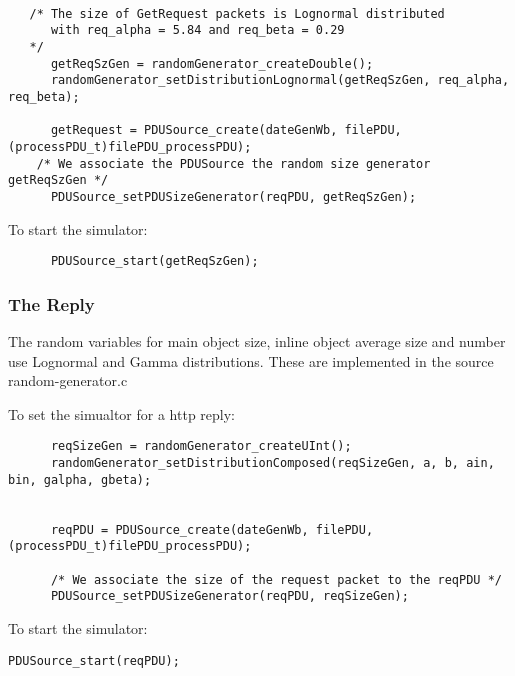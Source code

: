 \begin{verbatim}

   /* The size of GetRequest packets is Lognormal distributed 
      with req_alpha = 5.84 and req_beta = 0.29
   */    
      getReqSzGen = randomGenerator_createDouble();
      randomGenerator_setDistributionLognormal(getReqSzGen, req_alpha, req_beta);
      
      getRequest = PDUSource_create(dateGenWb, filePDU, (processPDU_t)filePDU_processPDU); 
    /* We associate the PDUSource the random size generator getReqSzGen */
      PDUSource_setPDUSizeGenerator(reqPDU, getReqSzGen);

\end{verbatim}

 To start the simulator:
\begin{verbatim}
      PDUSource_start(getReqSzGen);
\end{verbatim}

\subsubsection{The Reply} 

The random variables for main object size, inline object average size and number use Lognormal and Gamma distributions.
 These are implemented in the source random-generator.c

To set the simualtor for a http reply:

\begin{verbatim}
      reqSizeGen = randomGenerator_createUInt();
      randomGenerator_setDistributionComposed(reqSizeGen, a, b, ain, bin, galpha, gbeta);
      
 
      reqPDU = PDUSource_create(dateGenWb, filePDU, (processPDU_t)filePDU_processPDU);  
  
      /* We associate the size of the request packet to the reqPDU */
      PDUSource_setPDUSizeGenerator(reqPDU, reqSizeGen);
\end{verbatim}

 To start the simulator:
\begin{verbatim}
PDUSource_start(reqPDU);
\end{verbatim}



